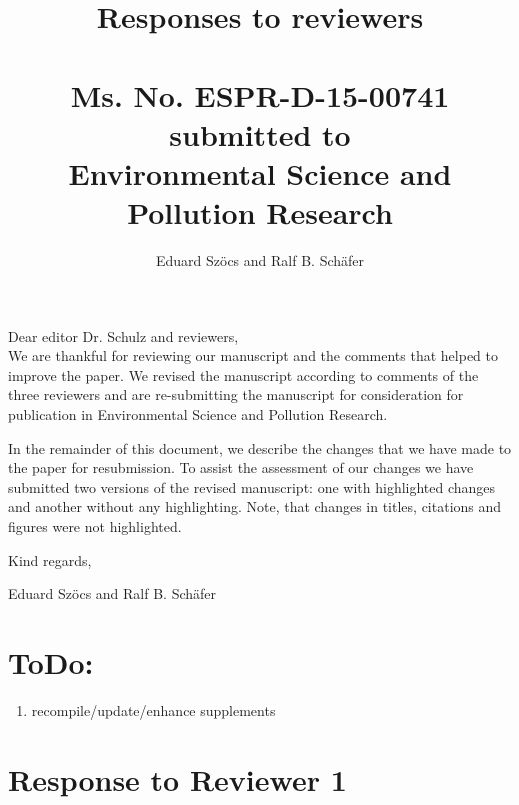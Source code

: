 \documentclass[12pt]{article}
\begin{document}
\title{Responses to reviewers\\~\\Ms. No. ESPR-D-15-00741\\submitted to\\Environmental Science and Pollution Research}

\author{Eduard Szöcs and Ralf B. Schäfer}

\maketitle
\noindent Dear editor Dr. Schulz  and reviewers,\\

We are thankful for reviewing our manuscript and the comments that helped to improve the paper. 
We revised the manuscript according to comments of the three reviewers and are re-submitting the manuscript for consideration for publication in Environmental Science and Pollution Research. 

In the remainder of this document, we describe the changes that we have made to the paper for resubmission. 
To assist the assessment of our changes we have submitted two versions of the revised manuscript: one with highlighted changes and another without any highlighting. 
Note, that changes in titles, citations and figures were not highlighted.

\vspace{2em}
\hfill Kind regards,

\hfill Eduard Szöcs and Ralf B. Schäfer

\newpage
\section{ToDo:}
\begin{enumerate}
	\item recompile/update/enhance supplements
\end{enumerate}


\section{Response to Reviewer 1}
\vspace{-2em}
\end{document}

